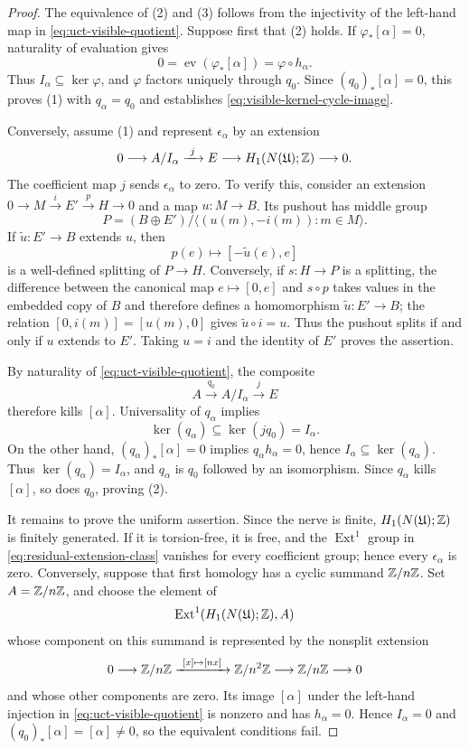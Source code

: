 \begin{proof}
The equivalence of \textup{(2)} and \textup{(3)} follows from the injectivity
of the left-hand map in \eqref{eq:uct-visible-quotient}.  Suppose first that
\textup{(2)} holds.  If $\varphi_*[\alpha]=0$, naturality of evaluation gives
\[
0=\operatorname{ev}(\varphi_*[\alpha])=\varphi\circ h_\alpha.
\]
Thus $I_\alpha\subseteq\ker\varphi$, and $\varphi$ factors uniquely through
$q_0$.  Since $(q_0)_*[\alpha]=0$, this proves \textup{(1)} with
$q_\alpha=q_0$ and establishes \eqref{eq:visible-kernel-cycle-image}.

Conversely, assume \textup{(1)} and represent $\epsilon_\alpha$ by an
extension
\begin{equation}\label{eq:residual-extension-representative}
0\longrightarrow A/I_\alpha
\xrightarrow{\ j\ } E\longrightarrow
H_1(N(\mathfrak{U});\mathbb{Z})\longrightarrow0.
\end{equation}
The coefficient map $j$ sends $\epsilon_\alpha$ to zero.  To verify this,
consider an extension
$0\to M\xrightarrow{i}E'\xrightarrow{p}H\to0$ and a map
$u\colon M\to B$.  Its pushout has middle group
\[
P=(B\oplus E')/\langle(u(m),-i(m)):m\in M\rangle.
\]
If $\widetilde u\colon E'\to B$ extends $u$, then
\[
p(e)\longmapsto[-\widetilde u(e),e]
\]
is a well-defined splitting of $P\to H$.  Conversely, if
$s\colon H\to P$ is a splitting, the difference between the canonical map
$e\mapsto[0,e]$ and $s\circ p$ takes values in the embedded copy of $B$ and
therefore defines a homomorphism $\widetilde u\colon E'\to B$; the relation
$[0,i(m)]=[u(m),0]$ gives $\widetilde u\circ i=u$.  Thus the pushout splits
if and only if $u$ extends to $E'$.  Taking $u=i$ and the identity of $E'$
proves the assertion.

By naturality of \eqref{eq:uct-visible-quotient}, the composite
\[
A\xrightarrow{\ q_0\ }A/I_\alpha\xrightarrow{\ j\ }E
\]
therefore kills $[\alpha]$.  Universality of $q_\alpha$ implies
\[
\ker(q_\alpha)\subseteq\ker(jq_0)=I_\alpha.
\]
On the other hand, $(q_\alpha)_*[\alpha]=0$ implies
$q_\alpha h_\alpha=0$, hence
$I_\alpha\subseteq\ker(q_\alpha)$.  Thus
$\ker(q_\alpha)=I_\alpha$, and $q_\alpha$ is $q_0$ followed by an
isomorphism.  Since $q_\alpha$ kills $[\alpha]$, so does $q_0$, proving
\textup{(2)}.

It remains to prove the uniform assertion.  Since the nerve is finite,
$H_1(N(\mathfrak{U});\mathbb{Z})$ is finitely generated.  If it is torsion-free,
it is free, and the $\operatorname{Ext}^1$ group in
\eqref{eq:residual-extension-class} vanishes for every coefficient group;
hence every $\epsilon_\alpha$ is zero.  Conversely, suppose that first
homology has a cyclic summand $\mathbb{Z}/n\mathbb{Z}$.  Set $A=\mathbb{Z}/n\mathbb{Z}$, and choose the
element of
\[
\operatorname{Ext}^1(H_1(N(\mathfrak{U});\mathbb{Z}),A)
\]
whose component on this summand is represented by the nonsplit extension
\[
0\longrightarrow\mathbb{Z}/n\mathbb{Z}
\xrightarrow{\ [x]\mapsto[nx]\ }\mathbb{Z}/n^2\mathbb{Z}
\longrightarrow\mathbb{Z}/n\mathbb{Z}\longrightarrow0
\]
and whose other components are zero.  Its image $[\alpha]$ under the
left-hand injection in \eqref{eq:uct-visible-quotient} is nonzero and has
$h_\alpha=0$.  Hence $I_\alpha=0$ and
$(q_0)_*[\alpha]=[\alpha]\ne0$, so the equivalent conditions fail.
\end{proof}

